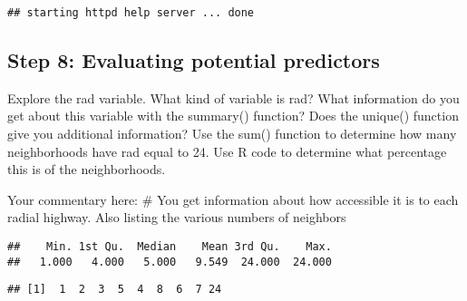 \documentclass[
]{article}
\newenvironment{Shaded}{\begin{snugshade}}{\end{snugshade}}
\newcommand{\CommentTok}[1]{\textcolor[rgb]{0.56,0.35,0.01}{\textit{#1}}}
\newcommand{\FunctionTok}[1]{\textcolor[rgb]{0.00,0.00,0.00}{#1}}
\newcommand{\NormalTok}[1]{#1}
\newcommand{\SpecialCharTok}[1]{\textcolor[rgb]{0.00,0.00,0.00}{#1}}
\begin{document}
\begin{verbatim}
## starting httpd help server ... done
\end{verbatim}

\hypertarget{step-8-evaluating-potential-predictors}{%
\subsection{Step 8: Evaluating potential
predictors}\label{step-8-evaluating-potential-predictors}}

Explore the rad variable. What kind of variable is rad? What information
do you get about this variable with the summary() function? Does the
unique() function give you additional information? Use the sum()
function to determine how many neighborhoods have rad equal to 24. Use R
code to determine what percentage this is of the neighborhoods.

Your commentary here: \# You get information about how accessible it is
to each radial highway. Also listing the various numbers of neighbors

\begin{Shaded}
\end{Shaded}

\begin{verbatim}
##    Min. 1st Qu.  Median    Mean 3rd Qu.    Max. 
##   1.000   4.000   5.000   9.549  24.000  24.000
\end{verbatim}

\begin{Shaded}
\end{Shaded}

\begin{verbatim}
## [1]  1  2  3  5  4  8  6  7 24
\end{verbatim}

\begin{Shaded}
\end{Shaded}
\end{document}
